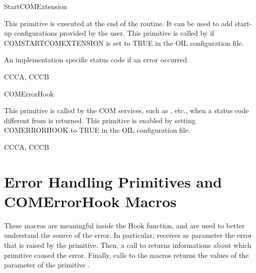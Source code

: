 
\begin{function_nopb}{StartCOMExtension}
  \begin{fundescription}
    This primitive is executed at the end of the  routine. It can
    be used to add start-up configurations provided by the user. This 
    primitive is called by  if COMSTARTCOMEXTENSION  is set to 
    TRUE in the OIL configuration file. 
  \end{fundescription}
  \begin{funreturn}
   \fret{} {An implementation specific status code if an error occurred.}
   \end{funreturn}
  \begin{funconformance}
    CCCA, CCCB
  \end{funconformance}
\end{function_nopb}

\begin{function_nopb}{COMErrorHook}
  \begin{fundescription}
    This primitive is called by the COM services, such as , 
     etc., when a status code different from  is 
     returned. This primitive is enabled by setting COMERRORHOOK to TRUE in 
     the OIL configuration file. 
  \end{fundescription}
  \begin{funparameters}
  \end{funparameters}
  \begin{funconformance}
    CCCA, CCCB
  \end{funconformance}
\end{function_nopb}


\pagebreak


\section{Error Handling Primitives and COMErrorHook Macros}
\label{sec:errorhook-macros}
These macros are meaningful inside the  Hook
function, and are used to better understand the source of the
error. In particular,  receives as parameter the
error that is raised by the primitive. Then, a call to
 returns informations about which
primitive caused the error. Finally, calls to the macros
 returns the values of the  parameter
of the primitive . 

